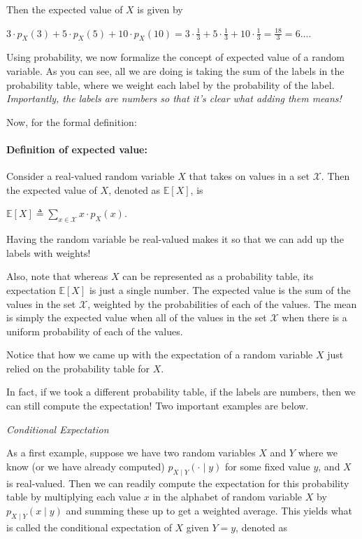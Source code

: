 \documentclass[6008notes.tex]{subfiles}
\begin{document}
Then the expected value of $X$ is given by

{\centering$3\cdot p_{X}(3)+5\cdot p_{X}(5)+10\cdot p_{X}(10)=3\cdot \frac{1}{3}+5\cdot \frac{1}{3}+10\cdot \frac{1}{3}=\frac{18}{3}=6.\dots$ \par}
 
Using probability, we now formalize the concept of expected value of a random variable. As you can see, all we are doing is taking the sum of the labels in the probability table, where we weight each label by the probability of the label. \textit{Importantly, the labels are numbers so that it's clear what adding them means!}

Now, for the formal definition:

\paragraph{Definition of expected value:} Consider a real-valued random variable $X$ that takes on values in a set $\mathcal{X}$. Then the expected value of $X$, denoted as $\mathbb {E}[X]$, is

{\centering$\mathbb {E}[X]\triangleq \sum _{x\in \mathcal{X}}x\cdot p_{X}(x).$ \par}
 
Having the random variable be real-valued makes it so that we can add up the labels with weights!

Also, note that whereas $X$ can be represented as a probability table, its expectation $\mathbb {E}[X]$ is just a single number. The expected value is the sum of the values in the set $\mathcal{X}$, weighted by the probabilities of each of the values. The mean is simply the expected value when all of the values in the set $\mathcal{X}$ when there is a uniform probability of each of the values.

Notice that how we came up with the expectation of a random variable $X$ just relied on the probability table for $X$.

In fact, if we took a different probability table, if the labels are numbers, then we can still compute the expectation! Two important examples are below.

\textit{Conditional Expectation}

As a first example, suppose we have two random variables $X$ and $Y$ where we know (or we have already computed) $p_{X\mid Y}(\cdot \mid y)$ for some fixed value $y$, and $X$ is real-valued. Then we can readily compute the expectation for this probability table by multiplying each value $x$ in the alphabet of random variable $X$ by $p_{X\mid Y}(x \mid y)$ and summing these up to get a weighted average. This yields what is called the conditional expectation of $X$ given $Y=y$, denoted as
\end{document}
